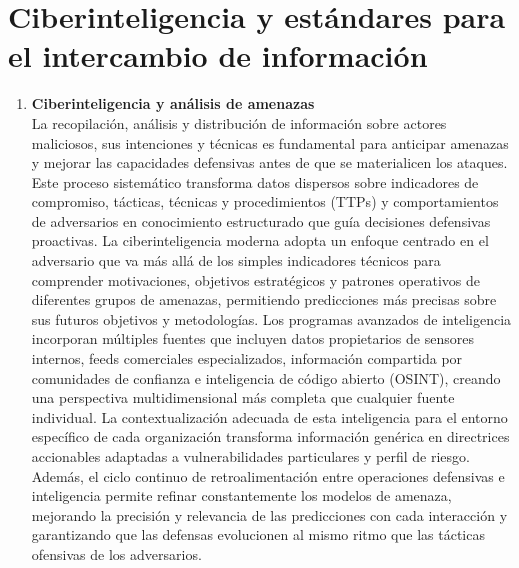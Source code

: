 \section{Ciberinteligencia y estándares para el intercambio de información}
\begin{enumerate}
\item \textbf{Ciberinteligencia y análisis de amenazas} \\
La recopilación, análisis y distribución de información sobre actores maliciosos, sus intenciones y técnicas es fundamental para anticipar amenazas y mejorar las capacidades defensivas antes de que se materialicen los ataques. Este proceso sistemático transforma datos dispersos sobre indicadores de compromiso, tácticas, técnicas y procedimientos (TTPs) y comportamientos de adversarios en conocimiento estructurado que guía decisiones defensivas proactivas. La ciberinteligencia moderna adopta un enfoque centrado en el adversario que va más allá de los simples indicadores técnicos para comprender motivaciones, objetivos estratégicos y patrones operativos de diferentes grupos de amenazas, permitiendo predicciones más precisas sobre sus futuros objetivos y metodologías. Los programas avanzados de inteligencia incorporan múltiples fuentes que incluyen datos propietarios de sensores internos, feeds comerciales especializados, información compartida por comunidades de confianza e inteligencia de código abierto (OSINT), creando una perspectiva multidimensional más completa que cualquier fuente individual. La contextualización adecuada de esta inteligencia para el entorno específico de cada organización transforma información genérica en directrices accionables adaptadas a vulnerabilidades particulares y perfil de riesgo. Además, el ciclo continuo de retroalimentación entre operaciones defensivas e inteligencia permite refinar constantemente los modelos de amenaza, mejorando la precisión y relevancia de las predicciones con cada interacción y garantizando que las defensas evolucionen al mismo ritmo que las tácticas ofensivas de los adversarios.


\end{enumerate}

